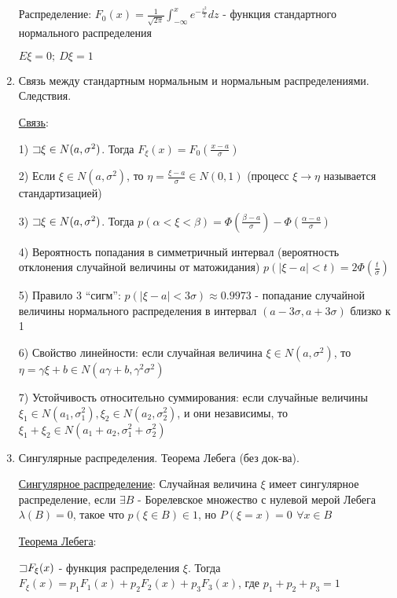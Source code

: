 \documentclass[12pt]{article}
\begin{document}
\begin{enumerate}
    Распределение: $F_0(x) = \frac{1}{\sqrt{2\pi}} \int_{-\infty}^x e^{-\frac{z^2}{2}} dz$ - функция стандартного нормального распределения

    $E\xi = 0; \ D\xi = 1$

    \item Связь между стандартным нормальным и нормальным распределениями. Следствия.

    \hyperlink{connectionbetweennormalandstandard}{Связь}: 

    1) $\mathord{\sqsupset} \xi \in N(a, \sigma^2)$. Тогда $F_\xi(x) = F_0\left(\frac{x - a}{\sigma}\right)$

    2) Если $\xi \in N(a, \sigma^2)$, то $\eta = \frac{\xi - a}{\sigma} \in N(0, 1)$ (процесс $\xi \to \eta$ называется стандартизацией)

    3) $\mathord{\sqsupset} \xi \in N(a, \sigma^2)$. Тогда $p(\alpha < \xi < \beta) = \Phi\left(\frac{\beta - a}{\sigma}\right) - \Phi\left(\frac{\alpha - a}{\sigma}\right)$

    4) Вероятность попадания в симметричный интервал (вероятность отклонения случайной величины от матожидания) 
    $p(|\xi - a| < t) = 2\Phi\left(\frac{t}{\sigma}\right)$

    5) Правило 3 \enquote{сигм}: $p(|\xi - a| < 3\sigma) \approx 0.9973$ - попадание случайной величины нормального распределения в интервал $(a - 3\sigma, a + 3\sigma)$ близко к 1

    6) Свойство линейности: если случайная величина $\xi \in N(a, \sigma^2)$, то $\eta = \gamma \xi + b \in N(a \gamma + b, \gamma^2 \sigma^2)$ 
    
    7) Устойчивость относительно суммирования: если случайные величины $\xi_1 \in N(a_1, \sigma_1^2), \xi_2 \in N(a_2, \sigma_2^2)$, и они независимы, то $\xi_1 + \xi_2 \in N(a_1 + a_2, \sigma^2_1 + \sigma^2_2)$

    
    \item Сингулярные распределения. Теорема Лебега (без док-ва).

    \hyperlink{singulardistribution}{Сингулярное распределение}: Случайная величина $\xi$ имеет сингулярное распределение, если $\exists B$ - Борелевское множество с нулевой мерой Лебега $\lambda(B) = 0$, такое что $p(\xi \in B) \in 1$, но $P(\xi = x) = 0 \ \, \forall x \in B$

    \hyperlink{lebesguetheorem}{Теорема Лебега}: 

    $\mathord{\sqsupset} F_\xi(x)$ - функция распределения $\xi$. Тогда $F_\xi(x) = p_1 F_1(x) + p_2 F_2(x) + p_3 F_3(x)$, где $p_1 + p_2 + p_3 = 1$


\end{enumerate}
\end{document}
